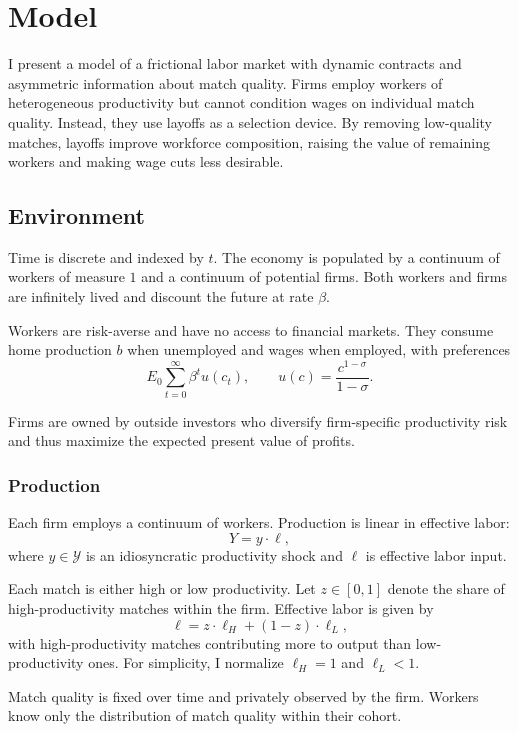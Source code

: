 \section{Model}

I present a model of a frictional labor market with dynamic contracts and asymmetric information about match quality. Firms employ workers of heterogeneous productivity but cannot condition wages on individual match quality. Instead, they use layoffs as a selection device. By removing low-quality matches, layoffs improve workforce composition, raising the value of remaining workers and making wage cuts less desirable.

\subsection{Environment}

Time is discrete and indexed by $t$. The economy is populated by a continuum of workers of measure $1$ and a continuum of potential firms. Both workers and firms are infinitely lived and discount the future at rate $\beta$.

Workers are risk-averse and have no access to financial markets. They consume home production $b$ when unemployed and wages when employed, with preferences
\[
E_0 \sum_{t=0}^{\infty} \beta^t u(c_t), \qquad u(c)=\frac{c^{1-\sigma}}{1-\sigma}.
\]

Firms are owned by outside investors who diversify firm-specific productivity risk and thus maximize the expected present value of profits.

\subsubsection*{Production}

Each firm employs a continuum of workers. Production is linear in effective labor:
\[
Y = y \cdot \ell,
\]
where $y \in \mathcal{Y}$ is an idiosyncratic productivity shock and $\ell$ is effective labor input.

Each match is either high or low productivity. Let $z \in [0,1]$ denote the share of high-productivity matches within the firm. Effective labor is given by
\[
\ell = z \cdot \ell_H + (1-z)\cdot \ell_L,
\]
with high-productivity matches contributing more to output than low-productivity ones. For simplicity, I normalize $\ell_H=1$ and $\ell_L<1$.

Match quality is fixed over time and privately observed by the firm. Workers know only the distribution of match quality within their cohort.

